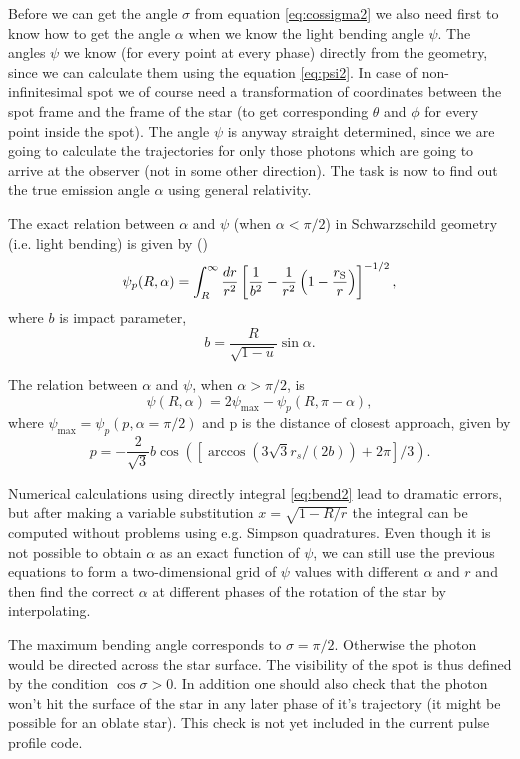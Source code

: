 \documentclass{wihuri}
\def\rg{r_{\rm S}} %
\def\be{\begin{equation}}
\def\ee{\end{equation}}
\def\rg{r_{\rm S}} %
\begin{document}
Before we can get the angle $\sigma$ from equation \ref{eq:cossigma2} we also need first to know how to get the angle $\alpha$ when we know the light bending angle $\psi$. The angles $\psi$ we know (for every point at every phase) directly from the geometry, since we can calculate them using the equation \ref{eq:psi2}. In case of non-infinitesimal spot we of course need a  transformation of coordinates between the spot frame and the frame of the star (to get corresponding $\theta$ and $\phi$ for every point inside the spot). The angle $\psi$ is anyway straight determined, since we are going to calculate the trajectories for only those photons which are going to arrive at the observer (not in some other direction). The task is now to find out the true emission angle $\alpha$ using general relativity. 

The exact relation between $\alpha$ and $\psi$ (when $\alpha < \pi/2$) in Schwarzschild geometry (i.e. light bending) is given by (\cite{mtw}) %
\be \label{eq:bend2}
  \psi_{p}(R,\alpha)=\int_R^{\infty} \frac{dr}{r^2} \left[ \frac{1}{b^2} -
       \frac{1}{r^2}\left( 1- \frac{\rg}{r}\right)\right]^{-1/2} ,
\ee
where $b$ is impact parameter,
\be \label{eq:impact2}
  b=\frac{R}{\sqrt{1-u}} \sin\alpha .
\ee



The relation between  $\alpha$ and $\psi$, when $\alpha > \pi/2$, is 
\be 
\psi(R,\alpha)=2\psi_{\max}-\psi_{p}(R,\pi-\alpha),
\ee 
where $\psi_{\max} = \psi_{p}(p,\alpha=\pi/2)$ and p is the distance of closest approach, given by
\be
p = -\frac{2}{\sqrt{3}}b\cos([\arccos(3\sqrt{3}r_{s}/(2b))+2\pi]/3).
\ee


Numerical calculations using directly integral \ref{eq:bend2} lead to dramatic errors, but after making a variable substitution $x = \sqrt{1-R/r}$ the integral can be computed without problems using e.g. Simpson quadratures. Even though it is not possible to obtain $\alpha$ as an exact function of $\psi$, we can still use the previous equations to form a two-dimensional grid of $\psi$ values with different $\alpha$ and $r$ and then find the correct $\alpha$ at different phases of the rotation of the star by interpolating. 



The maximum bending angle corresponds to $\sigma=\pi/2$. Otherwise the photon would be directed across the star surface. 
The visibility of the spot is thus defined by the condition $\cos \sigma>0$. In addition one should also check that the photon won't hit the surface of the star in any later phase of it's trajectory (it might be possible for an oblate star). This check is not yet included in the current pulse profile code.
\end{document}
